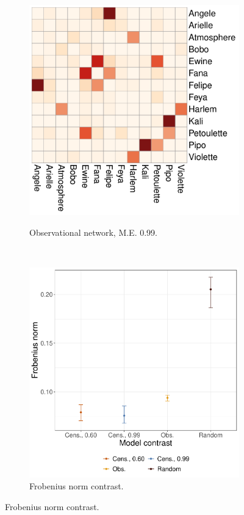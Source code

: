 \documentclass[Afour,sageh,times]{sagej}
\begin{document}
\begin{figure}[t]
\begin{minipage}[t]{0.31\textwidth}
\begin{subfigure}[t]{0.99\textwidth}
  \end{subfigure}
  \begin{subfigure}[t]{0.99\textwidth}
    \centering
        \caption{Observational network, M.E. 0.99.}
        \includegraphics[width=\textwidth]{Figures/Baboons_ME_1.pdf}
        \label{MonkeyBusiness4}
  \end{subfigure}
\end{minipage}
~
\begin{minipage}[t]{0.31\textwidth}
\centering
  \begin{subfigure}[t]{0.99\textwidth}
    \centering
        \caption{Frobenius norm contrast.}
        \includegraphics[width=\textwidth]{Figures/Baboons_Frob.pdf}

\end{subfigure}
\end{minipage}
\end{figure}
\end{document}
